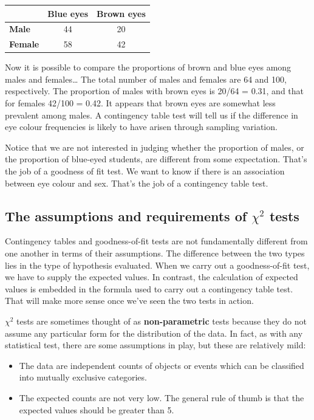 \documentclass[
]{book}
\providecommand{\tightlist}{%
  \setlength{\itemsep}{0pt}\setlength{\parskip}{0pt}}
\begin{document}
\begin{longtable}[]{@{}lcc@{}}
\toprule()
& Blue eyes & Brown eyes \\
\midrule()
\endhead
\textbf{Male} & 44 & 20 \\
\textbf{Female} & 58 & 42 \\
\bottomrule()
\end{longtable}

Now it is possible to compare the proportions of brown and blue eyes among males and females\ldots{} The total number of males and females are 64 and 100, respectively. The proportion of males with brown eyes is 20/64 = 0.31, and that for females 42/100 = 0.42. It appears that brown eyes are somewhat less prevalent among males. A contingency table test will tell us if the difference in eye colour frequencies is likely to have arisen through sampling variation.

Notice that we are not interested in judging whether the proportion of males, or the proportion of blue-eyed students, are different from some expectation. That's the job of a goodness of fit test. We want to know if there is an association between eye colour and sex. That's the job of a contingency table test.

\hypertarget{the-assumptions-and-requirements-of-chi2-tests}{%
\subsection{\texorpdfstring{The assumptions and requirements of \(\chi^{2}\) tests}{The assumptions and requirements of \textbackslash chi\^{}\{2\} tests}}\label{the-assumptions-and-requirements-of-chi2-tests}}

Contingency tables and goodness-of-fit tests are not fundamentally different from one another in terms of their assumptions. The difference between the two types lies in the type of hypothesis evaluated. When we carry out a goodness-of-fit test, we have to supply the expected values. In contrast, the calculation of expected values is embedded in the formula used to carry out a contingency table test. That will make more sense once we've seen the two tests in action.

\(\chi^{2}\) tests are sometimes thought of as \textbf{non-parametric} tests because they do not assume any particular form for the distribution of the data. In fact, as with any statistical test, there are some assumptions in play, but these are relatively mild:

\begin{itemize}
\tightlist
\item
  The data are independent counts of objects or events which can be classified into mutually exclusive categories.
\item
  The expected counts are not very low. The general rule of thumb is that the expected values should be greater than 5.
\end{itemize}
\end{document}
